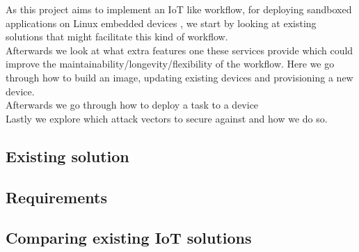 \documentclass[../../main.tex]{subfiles}
\begin{document}
As this project aims to implement an IoT like workflow, for deploying sandboxed applications
on Linux embedded devices , we start by looking at existing solutions that might
facilitate this kind of workflow.\\

Afterwards we look at what extra features one these services provide which could improve
the maintainability/longevity/flexibility of the workflow.
Here we go through how to build an image, updating existing devices and provisioning a new
device.\\

Afterwards we go through how to deploy a task to a device\\

Lastly we explore which attack vectors to secure against and how we do so.

\subsection{Existing solution}%
\label{sub:existing_solution}


\subsection{Requirements}%
\label{sub:requirements}


\subsection{Comparing existing IoT solutions}%
\label{sub:comparing_existing_iot_solutions}

	
\end{document}
